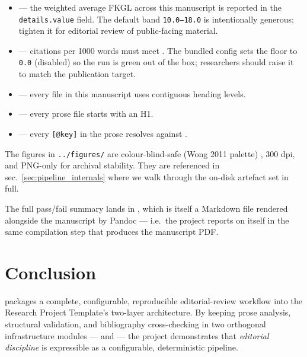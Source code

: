 \documentclass[
  english,
]{article}
\providecommand{\tightlist}{%
  \setlength{\itemsep}{0pt}\setlength{\parskip}{0pt}}
\begin{document}
\begin{itemize}
\tightlist
\item
  \textbf{} --- the weighted average FKGL
  across this manuscript is reported in the 
  \texttt{details.value} field. The default band \texttt{10.0–18.0} is
  intentionally generous; tighten it for editorial review of
  public-facing material.
\item
  \textbf{} --- citations per
  1000 words must meet .
  The bundled config sets the floor to \texttt{0.0} (disabled) so the
  run is green out of the box; researchers should raise it to match the
  publication target.
\item
  \textbf{} --- every file in this
  manuscript uses contiguous heading levels.
\item
  \textbf{} --- every prose file starts
  with an H1.
\item
  \textbf{} --- every
  \texttt{{[}@key{]}} in the prose resolves against
  .
\end{itemize}

The figures in \texttt{../figures/} are colour-blind-safe (Wong 2011
palette) \citep{wong2011points}, 300 dpi, and PNG-only for archival
stability. They are referenced in sec.~\ref{sec:pipeline_internals}
where we walk through the on-disk artefact set in full.

The full pass/fail summary lands in ,
which is itself a Markdown file rendered alongside the manuscript by
Pandoc --- i.e.~the project reports on itself in the same compilation
step that produces the manuscript PDF.

\newpage

\section{Conclusion}\label{sec:conclusion}

 packages a complete, configurable,
reproducible editorial-review workflow into the Research Project
Template's two-layer architecture. By keeping prose analysis, structural
validation, and bibliography cross-checking in two orthogonal
infrastructure modules ---  and
 --- the project demonstrates that
\emph{editorial discipline} is expressible as a configurable,
deterministic pipeline.
\end{document}
